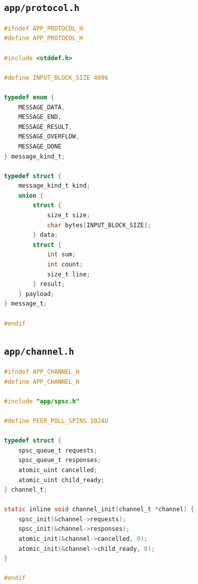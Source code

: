 \documentclass[12pt,a4paper,oneside,fleqn]{article}
\begin{document}
\subsection*{\texttt{app/protocol.h}}
\begin{lstlisting}[language=C]
#ifndef APP_PROTOCOL_H
#define APP_PROTOCOL_H

#include <stddef.h>

#define INPUT_BLOCK_SIZE 4096

typedef enum {
    MESSAGE_DATA,
    MESSAGE_END,
    MESSAGE_RESULT,
    MESSAGE_OVERFLOW,
    MESSAGE_DONE
} message_kind_t;

typedef struct {
    message_kind_t kind;
    union {
        struct {
            size_t size;
            char bytes[INPUT_BLOCK_SIZE];
        } data;
        struct {
            int sum;
            int count;
            size_t line;
        } result;
    } payload;
} message_t;

#endif
\end{lstlisting}
\subsection*{\texttt{app/channel.h}}
\begin{lstlisting}[language=C]
#ifndef APP_CHANNEL_H
#define APP_CHANNEL_H

#include "app/spsc.h"

#define PEER_POLL_SPINS 1024U

typedef struct {
    spsc_queue_t requests;
    spsc_queue_t responses;
    atomic_uint cancelled;
    atomic_uint child_ready;
} channel_t;

static inline void channel_init(channel_t *channel) {
    spsc_init(&channel->requests);
    spsc_init(&channel->responses);
    atomic_init(&channel->cancelled, 0);
    atomic_init(&channel->child_ready, 0);
}

#endif
\end{lstlisting}
\end{document}
